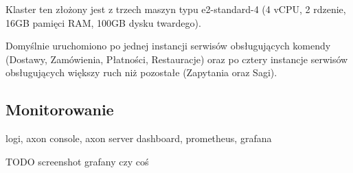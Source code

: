 Klaster ten złożony jest z trzech maszyn typu e2-standard-4 (4 vCPU, 2 rdzenie, 16GB pamięci RAM, 100GB dysku twardego).

Domyślnie uruchomiono po jednej instancji serwisów obsługujących komendy (Dostawy, Zamówienia, Płatności, Restauracje) oraz po cztery instancje serwisów obsługujących większy ruch niż pozostałe (Zapytania oraz Sagi).

\subsection{Monitorowanie}

logi, axon console, axon server dashboard, prometheus, grafana

TODO screenshot grafany czy coś